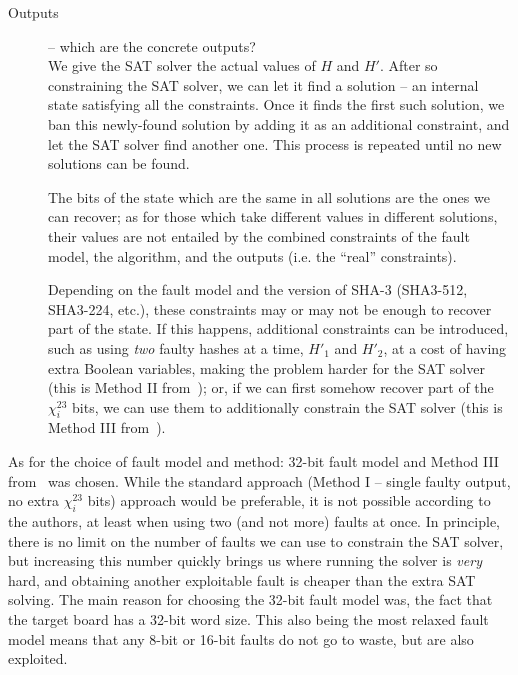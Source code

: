 \documentclass[times, utf8, diplomski]{fer}
\begin{document}
\begin{description}
    \item[Outputs] -- which are the concrete outputs?\\
	We give the SAT solver the actual values of $H$ and $H'$.
	After so constraining the SAT solver, we can let it find a solution -- an
    internal state satisfying all the constraints. Once it finds the first such solution,
    we ban this newly-found solution by adding it as an additional constraint, and let the
    SAT solver find another one. This process is repeated until no new solutions can be found.
	
	The bits of the state which are the same in all solutions are the ones we can recover;
    as for those which take different values in different solutions, their values are
    not entailed by the combined constraints of the fault model, the algorithm, and
    the outputs (i.e. the ``real'' constraints).
	
	Depending on the fault model and the version of SHA-3 (SHA3-512, SHA3-224, etc.),
    these constraints may or may not be enough to recover part of the state. If this happens,
    additional constraints can be introduced, such as using \emph{two} faulty hashes at a time,
    $H'_1$ and $H'_2$, at a cost of having extra Boolean variables, making the problem harder
    for the SAT solver (this is Method II from~\cite{luo2018algebraic}); or, if we can first
    somehow recover part of the $\chi^{23}_i$ bits, we can use them to additionally constrain
    the SAT solver (this is Method III from~\cite{luo2018algebraic}).
\end{description}

As for the choice of fault model and method: 32-bit fault model and Method III
from~\cite{luo2018algebraic} was chosen. While the standard approach (Method I
-- single faulty output, no extra $\chi^{23}_i$ bits) approach would be preferable,
it is not possible according to the authors, at least when using two (and not more)
faults at once. In principle, there is no limit on the number of faults we can use
to constrain the SAT solver, but increasing this number quickly brings us where
running the solver is \emph{very} hard, and obtaining another exploitable fault
is cheaper than the extra SAT solving.
The main reason for choosing the 32-bit fault model was, the fact that the target
board has a 32-bit word size. This also being the most relaxed fault model means
that any 8-bit or 16-bit faults do not go to waste, but are also exploited.
\end{document}
